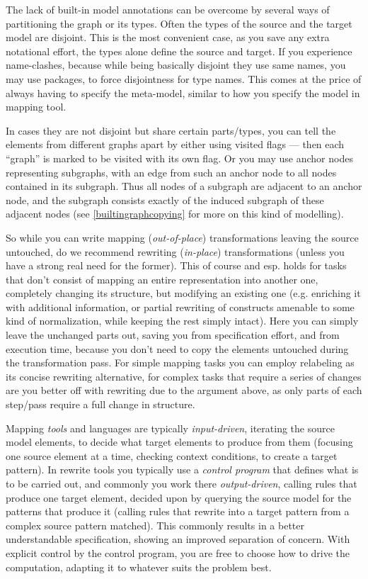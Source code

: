 The lack of built-in model annotations can be overcome by several ways of partitioning the graph or its types. 
Often the types of the source and the target model are disjoint.
This is the most convenient case, as you save any extra notational effort, the types alone define the source and target.
If you experience name-clashes, because while being basically disjoint they use same names, 
you may use packages, to force disjointness for type names.
This comes at the price of always having to specify the meta-model, similar to how you specify the model in mapping tool.

In cases they are not disjoint but share certain parts/types,
you can tell the elements from different graphs apart by either using visited flags --- then each ``graph'' is marked to be visited with its own flag.
Or you may use anchor nodes representing subgraphs, with an edge from such an anchor node to all nodes contained in its subgraph.
Thus all nodes of a subgraph are adjacent to an anchor node, and the subgraph consists exactly of the induced subgraph of these adjacent nodes (see \ref{builtingraphcopying} for more on this kind of modelling).

So while you can write mapping (\emph{out-of-place}) transformations leaving the source untouched, do we recommend rewriting (\emph{in-place}) transformations (unless you have a strong real need for the former).
This of course and esp. holds for tasks that don't consist of mapping an entire representation into another one, completely changing its structure, but modifying an existing one (e.g. enriching it with additional information, or partial rewriting of constructs amenable to some kind of normalization, while keeping the rest simply intact).
Here you can simply leave the unchanged parts out, saving you from specification effort, and from execution time, because you don't need to copy the elements untouched during the transformation pass.
For simple mapping tasks you can employ relabeling as its concise rewriting alternative, for complex tasks that require a series of changes are you better off with rewriting due to the argument above, as only parts of each step/pass require a full change in structure.

Mapping \emph{tools} and languages are typically \emph{input-driven}, iterating the source model elements, to decide what target elements to produce from them (focusing one source element at a time, checking context conditions, to create a target pattern).
In rewrite tools you typically use a \emph{control program} that defines what is to be carried out, and commonly you work there \emph{output-driven}, calling rules that produce one target element, decided upon by querying the source model for the patterns that produce it (calling rules that rewrite into a target pattern from a complex source pattern matched).
This commonly results in a better understandable specification, showing an improved separation of concern.
With explicit control by the control program, you are free to choose how to drive the computation, adapting it to whatever suits the problem best.


